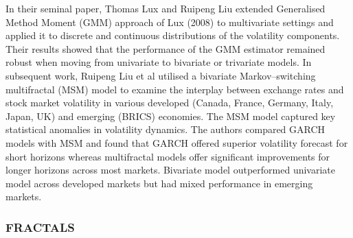 \documentclass[12pt,a4paper]{report}
\numberwithin{equation}{section}
\begin{document}
In their seminal paper, Thomas Lux and Ruipeng Liu \cite{lux2017generalized_14} extended
Generalised Method Moment (GMM) approach of Lux (2008) to multivariate
settings and applied it to discrete and continuous distributions of the
volatility components. Their results showed that the performance of the
GMM estimator remained robust when moving from univariate to bivariate
or trivariate models. In subsequent work, Ruipeng Liu et al \cite{liu2019volatility_15}
utilised a bivariate Markov--switching multifractal (MSM) model to
examine the interplay between exchange rates and stock market volatility
in various developed (Canada, France, Germany, Italy, Japan, UK) and
emerging (BRICS) economies. The MSM model captured key statistical
anomalies in volatility dynamics. The authors compared GARCH models with
MSM and found that GARCH offered superior volatility forecast for short
horizons whereas multifractal models offer significant improvements for
longer horizons across most markets. Bivariate model outperformed
univariate model across developed markets but had mixed performance in
emerging markets.

\hypertarget{fractals}{%
\subsubsection{FRACTALS}\label{fractals}}
\end{document}
